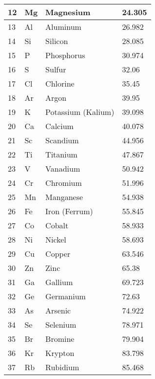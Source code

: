 \documentclass{article}
\begin{document}
\begin{center}
\begin{longtable}{|l|l|l|l|}
    12 & Mg &\cellcolor{alkalineyellow}Magnesium & 24.305\\
 \hline
    13 & Al & \cellcolor{postblue}Aluminum & 26.982\\
 \hline
    14 & Si & \cellcolor{metalloid}Silicon & 28.085\\
 \hline
    15 & P & \cellcolor{rnmgreen}Phosphorus & 30.974\\
 \hline
    16 & S & \cellcolor{rnmgreen}Sulfur & 32.06\\
 \hline
    17 & Cl & \cellcolor{rnmgreen}Chlorine & 35.45\\
 \hline
    18 & Ar &\cellcolor{noblepink}Argon & 39.95\\
 \hline
 \hline
    19 & K & \cellcolor{alkalibeige}Potassium (Kalium) & 39.098\\
 \hline
    20 & Ca & \cellcolor{alkalineyellow}Calcium & 40.078\\
 \hline
    21 & Sc & \cellcolor{transred}Scandium & 44.956\\
 \hline
    22 & Ti & \cellcolor{transred}Titanium & 47.867\\
 \hline
    23 & V & \cellcolor{transred}Vanadium & 50.942\\
 \hline
    24 & Cr & \cellcolor{transred}Chromium & 51.996\\
 \hline
    25 & Mn & \cellcolor{transred}Manganese & 54.938\\
 \hline
    26 & Fe & \cellcolor{transred}Iron (Ferrum) & 55.845\\
 \hline
    27 & Co & \cellcolor{transred}Cobalt & 58.933\\
 \hline
    28 & Ni & \cellcolor{transred}Nickel & 58.693\\
 \hline
    29 & Cu & \cellcolor{transred}Copper & 63.546\\
 \hline
    30 & Zn & \cellcolor{transred}Zinc & 65.38\\
 \hline
    31 & Ga & \cellcolor{postblue}Gallium & 69.723\\
 \hline
    32 & Ge & \cellcolor{metalloid}Germanium & 72.63\\
 \hline
    33 & As & \cellcolor{metalloid}Arsenic & 74.922\\
 \hline
    34 & Se & \cellcolor{rnmgreen}Selenium & 78.971\\
 \hline
    35 & Br & \cellcolor{rnmgreen}Bromine & 79.904\\
 \hline
    36 & Kr &\cellcolor{noblepink}Krypton & 83.798\\
 \hline
 \hline
    37 & Rb & \cellcolor{alkalibeige}Rubidium & 85.468\\

\end{longtable}
\end{center}
\end{document}
